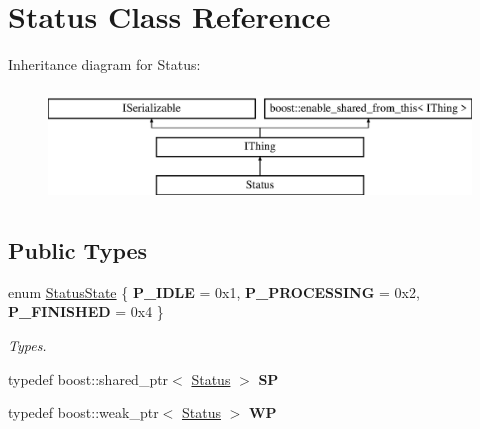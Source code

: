 \hypertarget{class_status}{}\section{Status Class Reference}
\label{class_status}
Inheritance diagram for Status\+:\begin{figure}[H]
\begin{center}
\leavevmode
\includegraphics[height=3.000000cm]{class_status}
\end{center}
\end{figure}
\subsection*{Public Types}
\begin{DoxyCompactItemize}
\item 
\mbox{\label{class_status_abefb09daa7775defc3ecc20a6f2cf5bc}} 
enum \hyperlink{class_status_abefb09daa7775defc3ecc20a6f2cf5bc}{Status\+State} \{ {\bfseries P\+\_\+\+I\+D\+LE} = 0x1, 
{\bfseries P\+\_\+\+P\+R\+O\+C\+E\+S\+S\+I\+NG} = 0x2, 
{\bfseries P\+\_\+\+F\+I\+N\+I\+S\+H\+ED} = 0x4
 \}\begin{DoxyCompactList}\small\item\em Types. \end{DoxyCompactList}
\item 
\mbox{\label{class_status_abb96ff5b200e14639211100edaac5b65}} 
typedef boost\+::shared\+\_\+ptr$<$ \hyperlink{class_status}{Status} $>$ {\bfseries SP}
\item 
\mbox{\label{class_status_a34791a434e50f43bcc15a0fc16a73804}} 
typedef boost\+::weak\+\_\+ptr$<$ \hyperlink{class_status}{Status} $>$ {\bfseries WP}
\end{DoxyCompactItemize}
